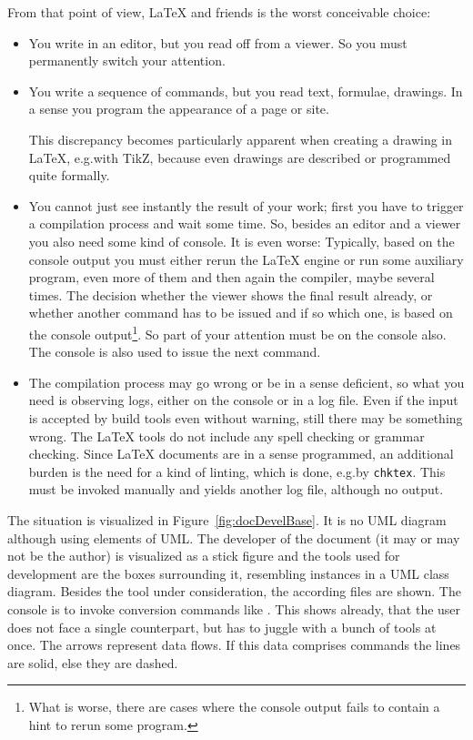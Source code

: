 From that point of view, \LaTeX{} and friends is the worst conceivable choice: 
%
\begin{itemize}
  \item
  You write in an editor, but you read off from a viewer. 
  So you must permanently switch your attention. 
  \item
  You write a sequence of commands, but you read text, formulae, drawings. 
  In a sense you program the appearance of a page or site. 

  This discrepancy becomes particularly apparent when creating a drawing in \LaTeX, 
  e.g.\@ with TikZ, because even drawings are described or programmed quite formally. 
  \item
  You cannot just see instantly the result of your work; 
  first you have to trigger a compilation process and wait some time. 
  So, besides an editor and a viewer you also need some kind of console. 
  It is even worse: 
  Typically, based on the console output you must either rerun the \LaTeX{} engine
  or run some auxiliary program, even more of them 
  and then again the compiler, maybe several times. 
  The decision whether the viewer shows the final result already, 
  or whether another command has to be issued and if so which one, 
  is based on the console output\footnote%
  {What is worse, there are cases where the console output fails 
  to contain a hint to rerun some program. 
  }. 
  So part of your attention must be on the console also. 
  The console is also used to issue the next command. 
  \item 
  The compilation process may go wrong or be in a sense deficient, 
  so what you need is observing logs, either on the console or in a log file. 
  Even if the input is accepted by build tools even without warning, 
  still there may be something wrong. 
  The \LaTeX{} tools do not include any spell checking or grammar checking. 
  Since \LaTeX{} documents are in a sense programmed, 
  an additional burden is the need for a kind of linting, 
  which is done, e.g.\@ by \texttt{chktex}. 
  This must be invoked manually and yields another log file, 
  although no output. 
\end{itemize}

The situation is visualized in Figure~\ref{fig:docDevelBase}. 
It is no UML diagram although using elements of UML\@. 
The developer of the document (it may or may not be the author) 
is visualized as a stick figure 
and the tools used for development are the boxes surrounding it,
resembling instances in a UML class diagram. 
Besides the tool under consideration, the according files are shown. 
The console is to invoke conversion commands like \lualatex. 
This shows already, that the user does not face a single counterpart, 
but has to juggle with a bunch of tools at once. 
The arrows represent data flows. 
If this data comprises commands the lines are solid, else they are dashed. 

